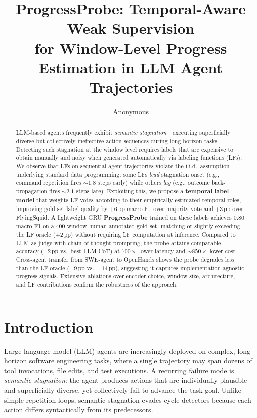 \documentclass[11pt]{article}
\title{ProgressProbe: Temporal-Aware Weak Supervision\\for Window-Level Progress Estimation in LLM Agent Trajectories}
\author{Anonymous}
\date{}
\begin{document}
\maketitle

\begin{abstract}
LLM-based agents frequently exhibit \emph{semantic stagnation}---executing superficially diverse but collectively ineffective action sequences during long-horizon tasks.
Detecting such stagnation at the window level requires labels that are expensive to obtain manually and noisy when generated automatically via labeling functions (LFs).
We observe that LFs on sequential agent trajectories violate the i.i.d.\ assumption underlying standard data programming: some LFs \emph{lead} stagnation onset (e.g., command repetition fires ${\sim}1.8$ steps early) while others \emph{lag} (e.g., outcome back-propagation fires ${\sim}2.1$ steps late).
Exploiting this, we propose a \textbf{temporal label model} that weights LF votes according to their empirically estimated temporal roles, improving gold-set label quality by $+6$\,pp macro-F1 over majority vote and $+3$\,pp over FlyingSquid.
A lightweight GRU \textbf{ProgressProbe} trained on these labels achieves $0.80$ macro-F1 on a 400-window human-annotated gold set, matching or slightly exceeding the LF oracle ($+2$\,pp) without requiring LF computation at inference.
Compared to LLM-as-judge with chain-of-thought prompting, the probe attains comparable accuracy ($-2$\,pp vs.\ best LLM CoT) at $700\times$ lower latency and ${\sim}850\times$ lower cost.
Cross-agent transfer from SWE-agent to OpenHands shows the probe degrades less than the LF oracle ($-9$\,pp vs.\ $-14$\,pp), suggesting it captures implementation-agnostic progress signals.
Extensive ablations over encoder choice, window size, architecture, and LF contributions confirm the robustness of the approach.
\end{abstract}

\section{Introduction}
\label{sec:intro}

Large language model (LLM) agents are increasingly deployed on complex, long-horizon software engineering tasks, where a single trajectory may span dozens of tool invocations, file edits, and test executions.
A recurring failure mode is \emph{semantic stagnation}: the agent produces actions that are individually plausible and superficially diverse, yet collectively fail to advance the task goal.
Unlike simple repetition loops, semantic stagnation evades cycle detectors because each action differs syntactically from its predecessors.
\end{document}
